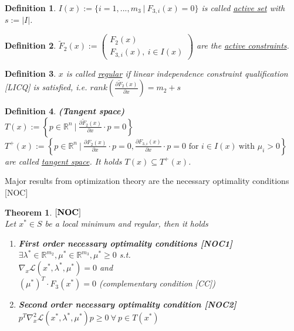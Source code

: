 \documentclass{scrartcl}[12pt, halfparskip]
\numberwithin{equation}{section}
\numberwithin{figure}{section}
\numberwithin{table}{section}
\newtheorem{Definition}{Definition}
\newtheorem{Theorem}{Theorem}
\begin{document}
\begin{Definition}
	$I(x) := \{ i=1,...,m_3 \ | \ F_{3,i}(x) = 0 \}$ is called \underline{active set} with $s := \vert I \vert$.
\end{Definition}

\begin{Definition}
	$\tilde{F}_2(x) := 
	\begin{pmatrix}
		F_2(x) \\
		F_{3,i}(x), \ i \in I(x) 
	\end{pmatrix}$
	are the \underline{active constraints}.
\end{Definition}

\begin{Definition}
	$x$ is called \underline{regular} if linear independence constraint qualification [LICQ] is satisfied, i.e. $rank \left( \frac{\partial \tilde F_2(x)}{\partial x} \right) = m_2 + s$
\end{Definition}

\begin{Definition}
	\textbf{(Tangent space)} \\
	$T(x) := \left\{ p \in \mathbb{R}^n \ | \ \frac{\partial \tilde F_2(x)}{\partial x} \cdot p = 0 \right\}$ \\
	$T^+(x) := \left\{ p \in \mathbb{R}^n \ | \ \frac{\partial F_2(x)}{\partial x} \cdot p = 0, \frac{\partial F_{3,i}(x)}{\partial x} \cdot p = 0 \text{ for } i \in I(x) \ \text{with } \mu_i > 0 \right\}$ \\
	are called \underline{tangent space}. It holds $T(x) \subseteq T^+(x)$.
\end{Definition}

Major results from optimization theory are the necessary optimality conditions [NOC]

\begin{Theorem}
	$[\text{\textbf{NOC}}]$ \\
	Let $x^* \in S$ be a local minimum and regular, then it holds
	\begin{enumerate}
		\item \textbf{First order necessary optimality conditions [NOC1]} \\
		$\exists \lambda^* \in \mathbb{R}^{m_2}, \mu^* \in \mathbb{R}^{m_3}, \mu^* \ge 0$ s.t. \\
		$\nabla_x \mathcal{L}(x^*, \lambda^*, \mu^*) = 0$ and \\
		$(\mu^*)^T \cdot F_3(x^*) = 0$ (complementary condition [CC])
		\item \textbf{Second order necessary optimality condition [NOC2]} \\
		$p^T \nabla_x^2 \mathcal{L}(x^*, \lambda^*, \mu^*) p \ge 0 \ \forall \ p \in T(x^*)$
	\end{enumerate}
\end{Theorem}
\end{document}
